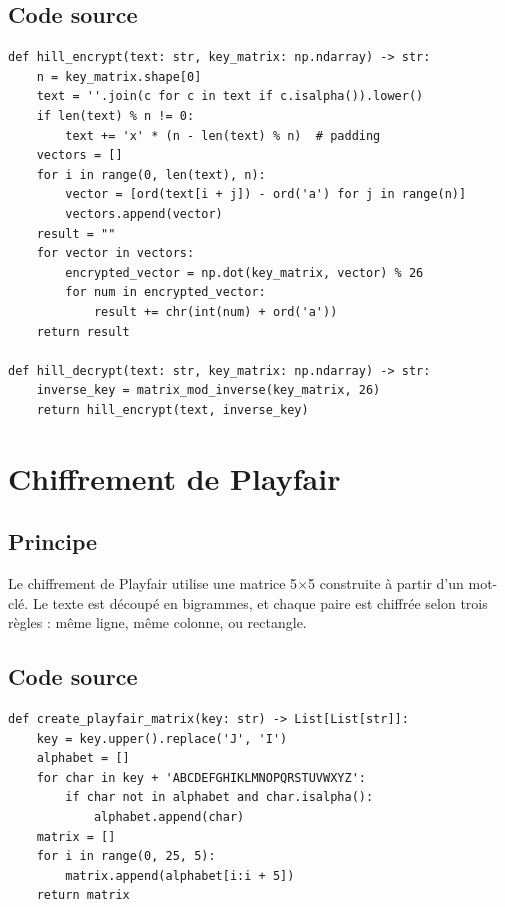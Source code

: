 \documentclass[12pt,a4paper]{report}
\begin{document}
\subsection{Code source}
\begin{lstlisting}[style=python,caption=Hill.py - Chiffrement]
def hill_encrypt(text: str, key_matrix: np.ndarray) -> str:
    n = key_matrix.shape[0]
    text = ''.join(c for c in text if c.isalpha()).lower()
    if len(text) % n != 0:
        text += 'x' * (n - len(text) % n)  # padding
    vectors = []
    for i in range(0, len(text), n):
        vector = [ord(text[i + j]) - ord('a') for j in range(n)]
        vectors.append(vector)
    result = ""
    for vector in vectors:
        encrypted_vector = np.dot(key_matrix, vector) % 26
        for num in encrypted_vector:
            result += chr(int(num) + ord('a'))
    return result

def hill_decrypt(text: str, key_matrix: np.ndarray) -> str:
    inverse_key = matrix_mod_inverse(key_matrix, 26)
    return hill_encrypt(text, inverse_key)
\end{lstlisting}

\section{Chiffrement de Playfair}

\subsection{Principe}
Le chiffrement de Playfair utilise une matrice 5$\times$5 construite à partir d'un mot-clé. Le texte est découpé en bigrammes, et chaque paire est chiffrée selon trois règles : même ligne, même colonne, ou rectangle.

\subsection{Code source}
\begin{lstlisting}[style=python,caption=Playfair.py - Construction de la matrice]
def create_playfair_matrix(key: str) -> List[List[str]]:
    key = key.upper().replace('J', 'I')
    alphabet = []
    for char in key + 'ABCDEFGHIKLMNOPQRSTUVWXYZ':
        if char not in alphabet and char.isalpha():
            alphabet.append(char)
    matrix = []
    for i in range(0, 25, 5):
        matrix.append(alphabet[i:i + 5])
    return matrix
\end{lstlisting}
\end{document}

